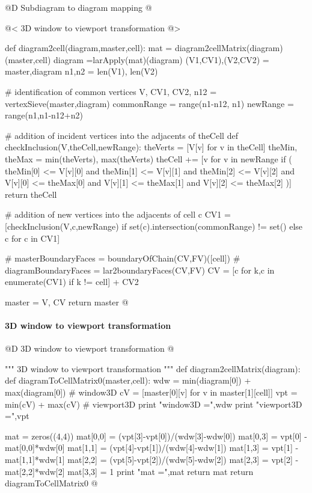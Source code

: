\documentclass[11pt,oneside]{article}	%
\begin{document}
@D Subdiagram to diagram mapping
@{
@< 3D window to viewport transformation @>

def diagram2cell(diagram,master,cell):
	mat = diagram2cellMatrix(diagram)(master,cell)
	diagram =larApply(mat)(diagram)	
	(V1,CV1),(V2,CV2) = master,diagram
	n1,n2 = len(V1), len(V2)
	
	# identification of common vertices
	V, CV1, CV2, n12 = vertexSieve(master,diagram)
	commonRange = range(n1-n12, n1)
	newRange = range(n1,n1-n12+n2)
	
	# addition of incident vertices into the adjacents of theCell
	def checkInclusion(V,theCell,newRange):
		theVerts = [V[v] for v in theCell]
		theMin, theMax = min(theVerts), max(theVerts)
		theCell += [v for v in newRange if (
			theMin[0] <= V[v][0] and theMin[1] <= V[v][1] and theMin[2] <= V[v][2] 
			and 
			V[v][0] <= theMax[0] and V[v][1] <= theMax[1] and V[v][2] <= theMax[2] 
			)]
		return theCell
	
	# addition of new vertices into the adjacents of cell c
	CV1 = [checkInclusion(V,c,newRange) 
			if set(c).intersection(commonRange) != set() else c
			 for c in CV1]
	
	# masterBoundaryFaces = boundaryOfChain(CV,FV)([cell])
	# diagramBoundaryFaces = lar2boundaryFaces(CV,FV)
	CV = [c for k,c in enumerate(CV1) if k != cell] + CV2
	
	master = V, CV
	return master
@}


\paragraph{3D window to viewport transformation}
@D 3D window to viewport transformation
@{""" 3D window to viewport transformation """
def diagram2cellMatrix(diagram):
	def diagramToCellMatrix0(master,cell):
		wdw = min(diagram[0]) + max(diagram[0])			# window3D
		cV = [master[0][v] for v in master[1][cell]]
		vpt = min(cV) + max(cV)								# viewport3D
		print "\n window3D =",wdw
		print "\n viewport3D =",vpt
		
		mat = zeros((4,4))
		mat[0,0] = (vpt[3]-vpt[0])/(wdw[3]-wdw[0])
		mat[0,3] = vpt[0] - mat[0,0]*wdw[0]
		mat[1,1] = (vpt[4]-vpt[1])/(wdw[4]-wdw[1])
		mat[1,3] = vpt[1] - mat[1,1]*wdw[1]
		mat[2,2] = (vpt[5]-vpt[2])/(wdw[5]-wdw[2])
		mat[2,3] = vpt[2] - mat[2,2]*wdw[2]
		mat[3,3] = 1
		print "\n mat =",mat
		return mat
	return diagramToCellMatrix0
@}
\end{document}
